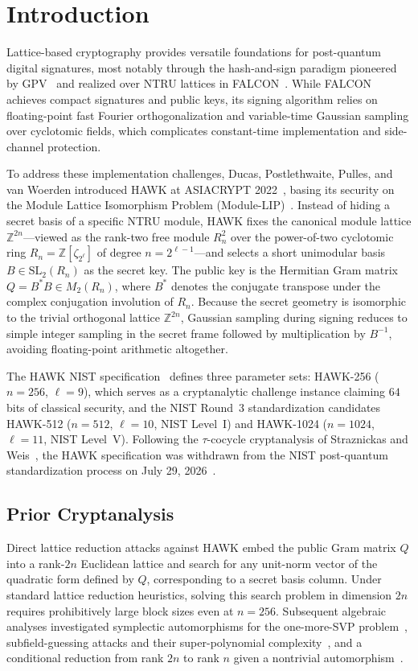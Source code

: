 \documentclass[11pt,a4paper]{article}
\theoremstyle{definition}
\newcommand{\Z}{\mathbb{Z}}
\begin{document}
\section{Introduction}
\label{sec:intro}

Lattice-based cryptography provides versatile foundations for post-quantum digital signatures, most notably through the hash-and-sign paradigm pioneered by GPV~\cite{GPV08} and realized over NTRU lattices in FALCON~\cite{PFH+20}. While FALCON achieves compact signatures and public keys, its signing algorithm relies on floating-point fast Fourier orthogonalization and variable-time Gaussian sampling over cyclotomic fields, which complicates constant-time implementation and side-channel protection.

To address these implementation challenges, Ducas, Postlethwaite, Pulles, and van Woerden introduced HAWK at ASIACRYPT 2022~\cite{DPPvW22}, basing its security on the Module Lattice Isomorphism Problem (Module-LIP)~\cite{DW22,DPPvW22}. Instead of hiding a secret basis of a specific NTRU module, HAWK fixes the canonical module lattice $\Z^{2n}$---viewed as the rank-two free module $R_n^2$ over the power-of-two cyclotomic ring $R_n = \Z[\zeta_{2^\ell}]$ of degree $n = 2^{\ell-1}$---and selects a short unimodular basis $B \in \mathrm{SL}_2(R_n)$ as the secret key. The public key is the Hermitian Gram matrix $Q = B^* B \in M_2(R_n)$, where $B^*$ denotes the conjugate transpose under the complex conjugation involution of $R_n$. Because the secret geometry is isomorphic to the trivial orthogonal lattice $\Z^{2n}$, Gaussian sampling during signing reduces to simple integer sampling in the secret frame followed by multiplication by $B^{-1}$, avoiding floating-point arithmetic altogether.

The HAWK NIST specification~\cite{HAWK25} defines three parameter sets: HAWK-256 ($n=256$, $\ell=9$), which serves as a cryptanalytic challenge instance claiming $64$ bits of classical security, and the NIST Round~3 standardization candidates HAWK-512 ($n=512$, $\ell=10$, NIST Level~I) and HAWK-1024 ($n=1024$, $\ell=11$, NIST Level~V). Following the $\tau$-cocycle cryptanalysis of Straznickas and Weis~\cite{SW26}, the HAWK specification was withdrawn from the NIST post-quantum standardization process on July 29, 2026~\cite{HAWK25}.

\subsection{Prior Cryptanalysis}
Direct lattice reduction attacks against HAWK embed the public Gram matrix $Q$ into a rank-$2n$ Euclidean lattice and search for any unit-norm vector of the quadratic form defined by $Q$, corresponding to a secret basis column. Under standard lattice reduction heuristics, solving this search problem in dimension $2n$ requires prohibitively large block sizes even at $n=256$. Subsequent algebraic analyses investigated symplectic automorphisms for the one-more-SVP problem~\cite{LJPW24}, subfield-guessing attacks and their super-polynomial complexity~\cite{NLLM26,Saa26}, and a conditional reduction from rank $2n$ to rank $n$ given a nontrivial automorphism~\cite{vGP25}.
\end{document}
